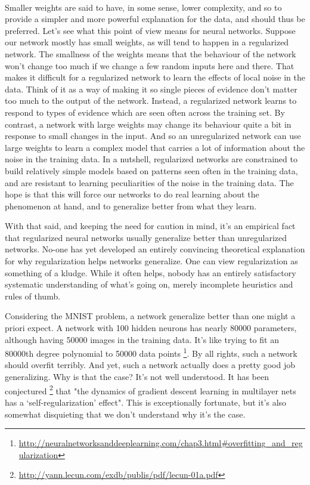 \paragraph{} Smaller weights are said to have, in some sense, lower complexity, and so to provide a simpler and more powerful explanation for the data, and should thus be preferred. Let's see what this point of view means for neural networks. Suppose our network mostly has small weights, as will tend to happen in a regularized network. The smallness of the weights means that the behaviour of the network won't change too much if we change a few random inputs here and there. That makes it difficult for a regularized network to learn the effects of local noise in the data. Think of it as a way of making it so single pieces of evidence don't matter too much to the output of the network. Instead, a regularized network learns to respond to types of evidence which are seen often across the training set. By contrast, a network with large weights may change its behaviour quite a bit in response to small changes in the input. And so an unregularized network can use large weights to learn a complex model that carries a lot of information about the noise in the training data. In a nutshell, regularized networks are constrained to build relatively simple models based on patterns seen often in the training data, and are resistant to learning peculiarities of the noise in the training data. The hope is that this will force our networks to do real learning about the phenomenon at hand, and to generalize better from what they learn.

With that said, and keeping the need for caution in mind, it's an empirical fact that regularized neural networks usually generalize better than unregularized networks. No-one has yet developed an entirely convincing theoretical explanation for why regularization helps networks generalize. One can view regularization as something of a kludge. While it often helps, nobody has an entirely satisfactory systematic understanding of what's going on, merely incomplete heuristics and rules of thumb.

Considering the MNIST problem, a network generalize better than one might a priori expect. A network with 100 hidden neurons has nearly 80000 parameters, although having 50000 images in the training data. It's like trying to fit an 80000th degree polynomial to 50000 data points \footnote{\url{http://neuralnetworksanddeeplearning.com/chap3.html\#overfitting\_and\_regularization}}. By all rights, such a network should overfit terribly. And yet, such a network actually does a pretty good job generalizing. Why is that the case? It's not well understood. It has been conjectured \footnote{\url{http://yann.lecun.com/exdb/publis/pdf/lecun-01a.pdf}} that "the dynamics of gradient descent learning in multilayer nets has a `self-regularization' effect". This is exceptionally fortunate, but it's also somewhat disquieting that we don't understand why it's the case.

